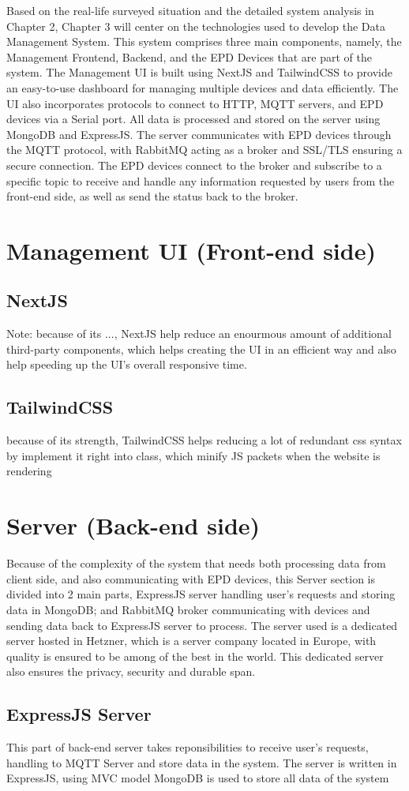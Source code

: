 \documentclass[../Main.tex]{subfiles}
\begin{document}
Based on the real-life surveyed situation and the detailed system analysis in Chapter 2, Chapter 3 will center on the technologies used to develop the Data Management System. This system comprises three main components, namely, the Management Frontend, Backend, and the EPD Devices that are part of the system. The Management UI is built using NextJS and TailwindCSS to provide an easy-to-use dashboard for managing multiple devices and data efficiently. The UI also incorporates protocols to connect to HTTP, MQTT servers, and EPD devices via a Serial port. All data is processed and stored on the server using MongoDB and ExpressJS. The server communicates with EPD devices through the MQTT protocol, with RabbitMQ acting as a broker and SSL/TLS ensuring a secure connection. The EPD devices connect to the broker and subscribe to a specific topic to receive and handle any information requested by users from the front-end side, as well as send the status back to the broker.

\section{Management UI (Front-end side)}
\subsection{NextJS}

Note: because of its ..., NextJS help reduce an enourmous amount of additional third-party components, which helps creating the UI in an efficient way and also help speeding up the UI's overall responsive time.
\subsection{TailwindCSS}

because of its strength, TailwindCSS helps reducing a lot of redundant css syntax by implement it right into class, which minify JS packets when the website is rendering

\section{Server (Back-end side)}
Because of the complexity of the system that needs both processing data from client side, and also communicating with EPD devices, this Server section is divided into 2 main parts, ExpressJS server handling user's requests and storing data in MongoDB; and RabbitMQ broker communicating with devices and sending data back to ExpressJS server to process. The server used is a dedicated server hosted in Hetzner, which is a server company located in Europe, with quality is ensured to be among of the best in the world. This dedicated server also ensures the privacy, security and durable span.

\subsection{ExpressJS Server}
This part of back-end server takes reponsibilities to receive user's requests, handling to MQTT Server and store data in the system. The server is written in ExpressJS, using MVC model MongoDB is used to store all data of the system
\end{document}
